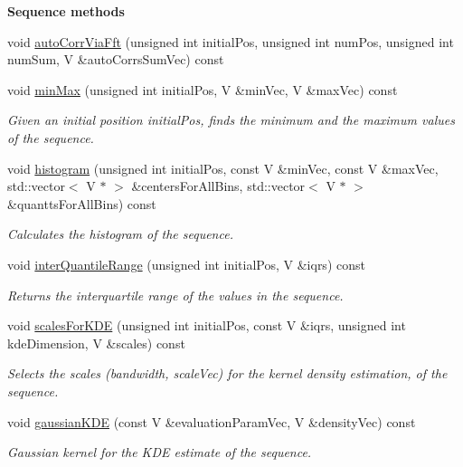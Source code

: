 \begin{Indent}{\bf Sequence methods}
\begin{DoxyCompactItemize}
\item 
void \hyperlink{class_q_u_e_s_o_1_1_array_of_sequences_a078e43442f5b12f7a886ace29af0aec0}{auto\-Corr\-Via\-Fft} (unsigned int initial\-Pos, unsigned int num\-Pos, unsigned int num\-Sum, V \&auto\-Corrs\-Sum\-Vec) const 
\item 
void \hyperlink{class_q_u_e_s_o_1_1_array_of_sequences_af318beb944a58dcb7b36a645f84edd3f}{min\-Max} (unsigned int initial\-Pos, V \&min\-Vec, V \&max\-Vec) const 
\begin{DoxyCompactList}\small\item\em Given an initial position {\ttfamily initial\-Pos}, finds the minimum and the maximum values of the sequence. \end{DoxyCompactList}\item 
void \hyperlink{class_q_u_e_s_o_1_1_array_of_sequences_a2beb77e521581b8c28d1fe0fe71018c6}{histogram} (unsigned int initial\-Pos, const V \&min\-Vec, const V \&max\-Vec, std\-::vector$<$ V $\ast$ $>$ \&centers\-For\-All\-Bins, std\-::vector$<$ V $\ast$ $>$ \&quantts\-For\-All\-Bins) const 
\begin{DoxyCompactList}\small\item\em Calculates the histogram of the sequence. \end{DoxyCompactList}\item 
void \hyperlink{class_q_u_e_s_o_1_1_array_of_sequences_a6cd1021725aa1d7e50034f482904660a}{inter\-Quantile\-Range} (unsigned int initial\-Pos, V \&iqrs) const 
\begin{DoxyCompactList}\small\item\em Returns the interquartile range of the values in the sequence. \end{DoxyCompactList}\item 
void \hyperlink{class_q_u_e_s_o_1_1_array_of_sequences_ae746fcec9567a5ef3c46f5559c90dee7}{scales\-For\-K\-D\-E} (unsigned int initial\-Pos, const V \&iqrs, unsigned int kde\-Dimension, V \&scales) const 
\begin{DoxyCompactList}\small\item\em Selects the scales (bandwidth, {\ttfamily scale\-Vec}) for the kernel density estimation, of the sequence. \end{DoxyCompactList}\item 
void \hyperlink{class_q_u_e_s_o_1_1_array_of_sequences_ade11b2ce02c1b7501a1c465dcfe63a1d}{gaussian\-K\-D\-E} (const V \&evaluation\-Param\-Vec, V \&density\-Vec) const 
\begin{DoxyCompactList}\small\item\em Gaussian kernel for the K\-D\-E estimate of the sequence. \end{DoxyCompactList}\item 

\end{DoxyCompactItemize}
\end{Indent}
